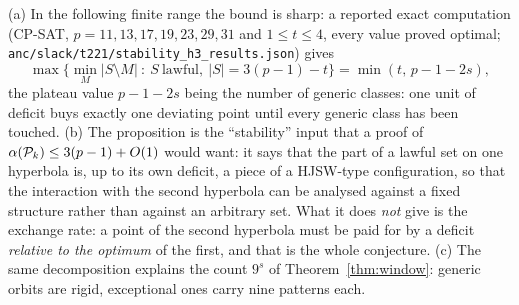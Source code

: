\begin{remark}
(a) In the following finite range the bound is sharp: a reported exact computation (CP-SAT,
$p=11,13,17,19,23,29,31$ and $1\le t\le4$, every value proved optimal; \texttt{anc/slack/t221/stability\_h3\_results.json}) gives
\[
 \max\{\min_M|S\setminus M|\ :\ S\ \text{lawful},\ |S|=3(p-1)-t\}=\min(t,\,p-1-2s),
\]
the plateau value $p-1-2s$ being the number of generic classes: one unit of deficit buys exactly one deviating point until every
generic class has been touched.
(b) The proposition is the ``stability'' input that a proof of $\alpha(\mathcal{P}_k)\le3(p-1)+O(1)$ would want: it says that the part of a
lawful set on one hyperbola is, up to its own deficit, a piece of a HJSW-type configuration, so that the interaction with the second
hyperbola can be analysed against a fixed structure rather than against an arbitrary set.  What it does \emph{not} give is the exchange
rate: a point of the second hyperbola must be paid for by a deficit \emph{relative to the optimum} of the first, and that is the whole
conjecture.
(c) The same decomposition explains the count $9^s$ of Theorem~\ref{thm:window}: generic orbits are rigid, exceptional ones carry nine
patterns each.
\end{remark}
